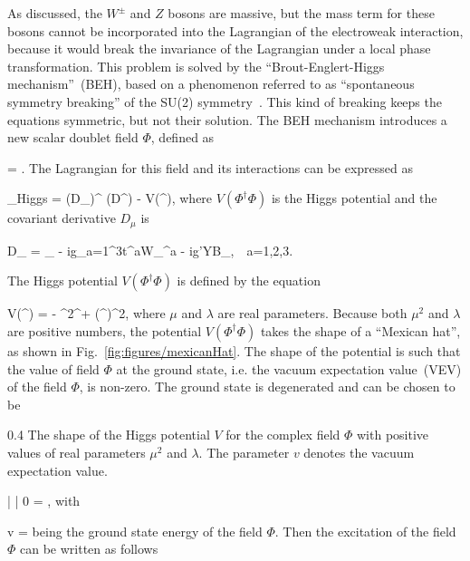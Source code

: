 As discussed, the $W^{\pm}$ and $Z$ bosons are massive, but the mass term for these bosons cannot be incorporated into the Lagrangian of the electroweak interaction, because it would break the invariance of the Lagrangian under a local phase transformation. This problem is solved by the ``Brout-Englert-Higgs mechanism''~(BEH), based on a phenomenon referred to as ``spontaneous symmetry breaking'' of the SU(2) symmetry~\cite{Englert:1964et, Guralnik:1964eu}. This kind of breaking keeps the equations symmetric, but not their solution. The BEH mechanism introduces a new scalar doublet field $\Phi$, defined as

{
    \Phi = .
}
The Lagrangian for this field and its interactions can be expressed as 

{
    _{Higgs} =  (D_{\mu}\Phi)^{\dagger} (D^{\mu}\Phi) - V(\Phi^{\dagger}\Phi),
}
where $V(\Phi^{\dagger}\Phi)$ is the Higgs potential and the covariant derivative $D_{\mu}$ is

{
   D_{\mu} = \partial_{\mu} - ig\sum_{a=1}^{3}t^{a}W_{\mu}^{a} - ig'YB_{\mu},~~a=1,2,3.
}

The Higgs potential $V(\Phi^{\dagger}\Phi)$ is defined by the equation

{
    V(\Phi^{\dagger}\Phi) =  -  \mu^{2}\Phi^{\dagger}\Phi +  \lambda(\Phi^{\dagger}\Phi)^{2},
}
where $\mu$ and $\lambda$ are real parameters. Because both $\mu^{2}$ and $\lambda$ are positive numbers, the potential $V(\Phi^{\dagger}\Phi)$ takes the shape of a ``Mexican hat'', as shown in Fig.~\ref{fig:figures/mexicanHat}. The shape of the potential is such that the value of field $\Phi$ at the ground state, i.e. the vacuum expectation value~(VEV) of the field $\Phi$, is non-zero. The ground state is degenerated and can be chosen to be

                 {0.4}       %
                 { The shape of the Higgs potential $V$ for the complex field $\Phi$ with positive values of real parameters $\mu^{2}$ and $\lambda$. The parameter $v$ denotes the vacuum expectation value.}

{
     | \Phi | 0 \rangle =  ,
}
with

{
v = 
}
being the ground state energy of the field $\Phi$. Then the excitation of the field $\Phi$ can be written as follows

